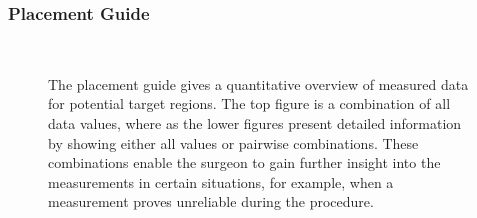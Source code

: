 \documentclass{vgtc}                          %
\begin{document}
\subsubsection{Placement Guide}\label{sec:overview:placement:guide}
\begin{figure}[t]
  \centering
  \\
  \caption{The placement guide gives a quantitative overview of measured data for potential target regions. The top figure is a combination of all data values, where as the lower figures present detailed information by showing either all values or pairwise combinations. These combinations enable the surgeon to gain further insight into the measurements in certain situations, for example, when a measurement proves unreliable during the procedure.}
  \label{fig:placementguide}
\end{figure}
\end{document}

